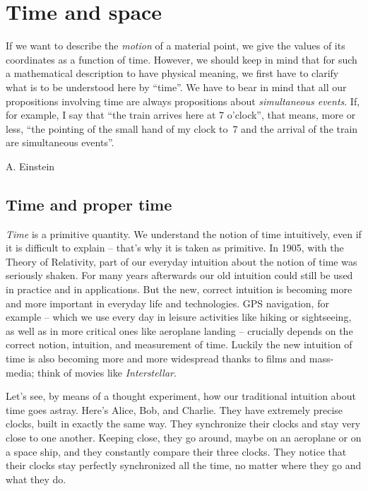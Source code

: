 \documentclass[a4paper,12pt,%
onecolumn,oneside,%
british%
]{memoir}
\providecommand{\href}[2]{#2}
\renewcommand*{\|}[1][]{\nonscript\:#1\vert\nonscript\:\mathopen{}}
\newcommand*{\furl}[2]{\href{#1}{#2}\pagenote{\url{#1}}}
\begin{document}
\printpagenotes*
\cleartooddpage
\chapter{Time and space}
\label{cha:time_space}

\epigraph{If we want to describe the \emph{motion} of a material point, we give the values of its coordinates as a function of time. However, we should keep in mind that for such a mathematical description to have physical meaning, we first have to clarify what is to be understood here by \enquote{time}. We have to bear in mind that all our propositions involving time are always propositions about \emph{simultaneous events}. If, for example, I say that \enquote{the train arrives here at 7 o'clock}, that means, more or less, \enquote{the pointing of the small hand of my clock to~7 and the arrival of the train are simultaneous events}.}{A. Einstein \cites*{einstein1905c}}




\section{Time and proper time}
\label{sec:time}



\emph{Time} is a primitive quantity. We understand the notion of time intuitively, even if it is difficult to explain -- that's why it is taken as primitive. In 1905, with the Theory of Relativity, part of our everyday intuition about the notion of time was seriously shaken. For many years afterwards our old intuition could still be used in practice and in applications. But the new, correct intuition is becoming more and more important in everyday life and technologies. GPS navigation, for example -- which we use every day in leisure activities like hiking or sightseeing, as well as in more critical ones like aeroplane landing -- crucially depends on the correct notion, intuition, and measurement of time. Luckily the new intuition of time is also becoming more and more widespread thanks to films and mass-media; think of movies like \furl{https://www.imdb.com/title/tt0816692/}{\emph{Interstellar}}.

Let's see, by means of a thought experiment, how our traditional intuition about time goes astray. Here's Alice, Bob, and Charlie. They have extremely precise clocks, built in exactly the same way. They synchronize their clocks and stay very close to one another. Keeping close, they go around, maybe on an aeroplane or on a space ship, and they constantly compare their three clocks. They notice that their clocks stay perfectly synchronized all the time, no matter where they go and what they do.
\end{document}
